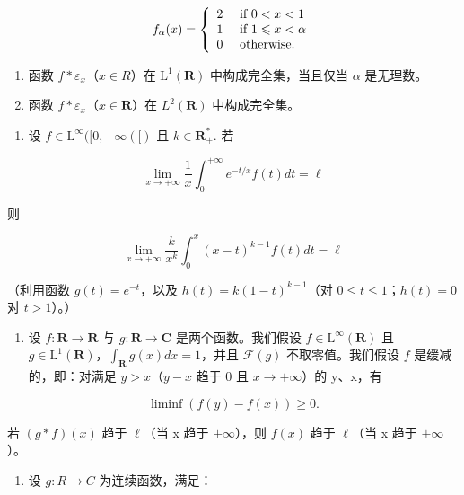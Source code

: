 \[
f _ {\alpha} (x) = \left\{ \begin{array}{l l} 2 & \text { if } 0 <   x <   1 \\ 1 & \text { if } 1 \leqslant x <   \alpha \\ 0 & \text { otherwise. } \end{array} \right.
\]

\begin{enumerate}
\def\labelenumi{\alph{enumi})}
\item
  函数 \(f * \varepsilon_{x}\)（\(x \in R\)）在 \(\mathrm{L}^{1}(\mathbf{R})\) 中构成完全集，当且仅当 \(\alpha\) 是无理数。
\item
  函数 \(f * \varepsilon_x\)（\(x \in \mathbf{R}\)）在 \(L^2(\mathbf{R})\) 中构成完全集。
\end{enumerate}

\begin{enumerate}
\def\labelenumi{\arabic{enumi})}
\setcounter{enumi}{4}
\tightlist
\item
  设 \(f \in \mathrm{L}^{\infty}([0, +\infty([)\text{ 且 } k \in \mathbf{R}_{+}^{*}. \text{ 若}\)
\end{enumerate}

\[
\lim _ {x \to + \infty} \frac {1}{x} \int_ {0} ^ {+ \infty} e ^ {- t / x} f (t) d t = \ell
\]

则

\[
\lim _ {x \rightarrow + \infty} \frac {k}{x ^ {k}} \int_ {0} ^ {x} (x - t) ^ {k - 1} f (t) d t = \ell
\]

（利用函数 \(g(t) = e^{-t}\)，以及 \(h(t) = k(1 - t)^{k-1}\)（对 \(0 \leqslant t \leqslant 1\)；\(h(t) = 0\) 对 \(t > 1\)）。）

\begin{enumerate}
\def\labelenumi{\arabic{enumi})}
\setcounter{enumi}{5}
\tightlist
\item
  设 \(f \colon \mathbf{R} \to \mathbf{R}\) 与 \(g: \mathbf{R} \to \mathbf{C}\) 是两个函数。我们假设 \(f \in \mathrm{L}^{\infty}(\mathbf{R})\) 且 \(g \in \mathrm{L}^{1}(\mathbf{R})\)，\(\int_{\mathbf{R}} g(x) dx = 1\)，并且 \(\mathcal{F}(g)\) 不取零值。我们假设 \(f\) 是缓减的，即：对满足 \(y > x\)（\(y - x\) 趋于 0 且 \(x \to +\infty\)）的 y、x，有
\end{enumerate}

\[
\liminf (f (y) - f (x)) \geqslant 0.
\]

若 \((g*f)(x)\) 趋于 \(\ell\)（当 x 趋于 \(+\infty\)），则 \(f(x)\) 趋于 \(\ell\)（当 x 趋于 \(+\infty\)）。

\begin{enumerate}
\def\labelenumi{\arabic{enumi})}
\setcounter{enumi}{6}
\tightlist
\item
  设 \(g: R \rightarrow C\) 为连续函数，满足：
\end{enumerate}

